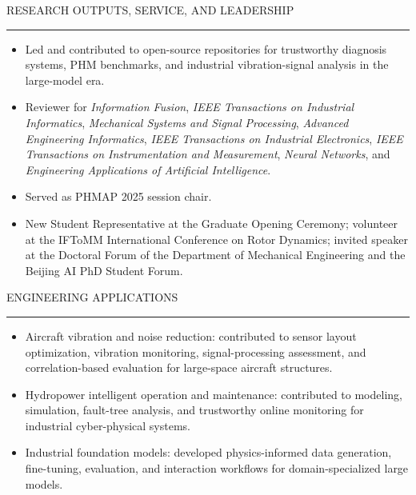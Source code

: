 \documentclass{resume}
\renewenvironment{rSection}[1]{
\sectionskip
\textcolor{TsinghuaPurple}{\MakeUppercase{#1}}
\sectionlineskip
\hrule
\begin{list}{}{\setlength{\leftmargin}{0em}}
\item[]
}{
\end{list}
}
\newcommand{\cvitem}[1]{\item #1}
\begin{document}
\begin{rSection}{Research Outputs, Service, and Leadership}
\begin{itemize}[leftmargin=1.2em,itemsep=0.15em,topsep=0.15em]
\cvitem{Led and contributed to open-source repositories for trustworthy diagnosis systems, PHM benchmarks, and industrial vibration-signal analysis in the large-model era.}
\cvitem{Reviewer for \textit{Information Fusion}, \textit{IEEE Transactions on Industrial Informatics}, \textit{Mechanical Systems and Signal Processing}, \textit{Advanced Engineering Informatics}, \textit{IEEE Transactions on Industrial Electronics}, \textit{IEEE Transactions on Instrumentation and Measurement}, \textit{Neural Networks}, and \textit{Engineering Applications of Artificial Intelligence}.}
\cvitem{Served as PHMAP 2025 session chair.}
\cvitem{New Student Representative at the Graduate Opening Ceremony; volunteer at the IFToMM International Conference on Rotor Dynamics; invited speaker at the Doctoral Forum of the Department of Mechanical Engineering and the Beijing AI PhD Student Forum.}
\end{itemize}
\end{rSection}

\begin{rSection}{Engineering Applications}
\begin{itemize}[leftmargin=1.2em,itemsep=0.15em,topsep=0.15em]
\cvitem{Aircraft vibration and noise reduction: contributed to sensor layout optimization, vibration monitoring, signal-processing assessment, and correlation-based evaluation for large-space aircraft structures.}
\cvitem{Hydropower intelligent operation and maintenance: contributed to modeling, simulation, fault-tree analysis, and trustworthy online monitoring for industrial cyber-physical systems.}
\cvitem{Industrial foundation models: developed physics-informed data generation, fine-tuning, evaluation, and interaction workflows for domain-specialized large models.}
\end{itemize}
\end{rSection}
\end{document}
